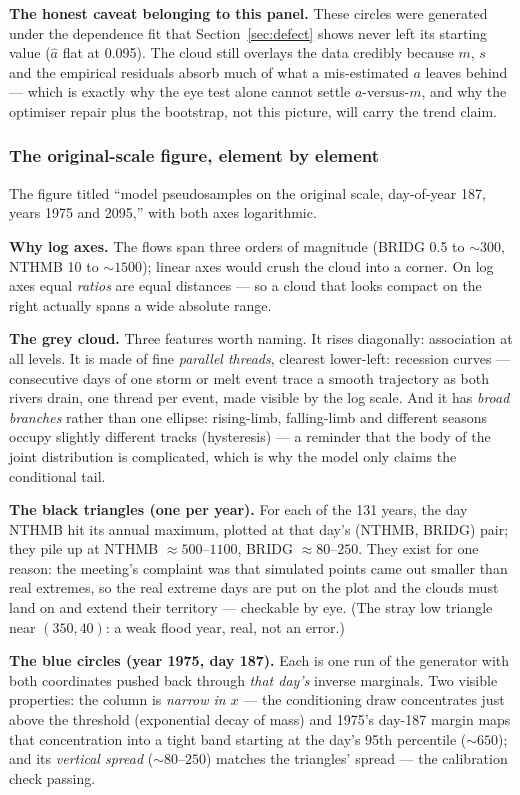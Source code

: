 \documentclass[11pt]{article}
\begin{document}
\textbf{The honest caveat belonging to this panel.} These circles were
generated under the dependence fit that Section~\ref{sec:defect} shows never
left its starting value ($\hat a$ flat at 0.095). The cloud still overlays
the data credibly because $m$, $s$ and the empirical residuals absorb much
of what a mis-estimated $a$ leaves behind --- which is exactly why the eye
test alone cannot settle $a$-versus-$m$, and why the optimiser repair plus
the bootstrap, not this picture, will carry the trend claim.

\subsubsection{The original-scale figure, element by element}

The figure titled ``model pseudosamples on the original scale, day-of-year
187, years 1975 and 2095,'' with both axes logarithmic.

\textbf{Why log axes.} The flows span three orders of magnitude (BRIDG 0.5
to $\sim 300$, NTHMB 10 to $\sim 1500$); linear axes would crush the cloud
into a corner. On log axes equal \emph{ratios} are equal distances --- so a
cloud that looks compact on the right actually spans a wide absolute range.

\textbf{The grey cloud.} Three features worth naming. It rises diagonally:
association at all levels. It is made of fine \emph{parallel threads},
clearest lower-left: recession curves --- consecutive days of one storm or
melt event trace a smooth trajectory as both rivers drain, one thread per
event, made visible by the log scale. And it has \emph{broad branches}
rather than one ellipse: rising-limb, falling-limb and different seasons
occupy slightly different tracks (hysteresis) --- a reminder that the body
of the joint distribution is complicated, which is why the model only
claims the conditional tail.

\textbf{The black triangles (one per year).} For each of the 131 years, the
day NTHMB hit its annual maximum, plotted at that day's (NTHMB, BRIDG)
pair; they pile up at NTHMB $\approx 500$--$1100$, BRIDG $\approx
80$--$250$. They exist for one reason: the meeting's complaint was that
simulated points came out smaller than real extremes, so the real extreme
days are put on the plot and the clouds must land on and extend their
territory --- checkable by eye. (The stray low triangle near $(350, 40)$: a
weak flood year, real, not an error.)

\textbf{The blue circles (year 1975, day 187).} Each is one run of the
generator with both coordinates pushed back through \emph{that day's}
inverse marginals. Two visible properties: the column is \emph{narrow in
$x$} --- the conditioning draw concentrates just above the threshold
(exponential decay of mass) and 1975's day-187 margin maps that
concentration into a tight band starting at the day's 95th percentile
($\sim 650$); and its \emph{vertical spread} ($\sim 80$--$250$) matches the
triangles' spread --- the calibration check passing.
\end{document}
